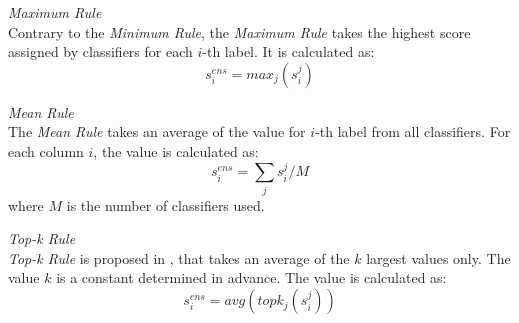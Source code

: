 \emph{Maximum Rule}\\
Contrary to the \emph{Minimum Rule}, the \emph{Maximum Rule} takes the highest score assigned by classifiers for each $i$-th label. It is calculated as:
\[s^{ens}_{i} = max_{j}(s^{j}_i)\]

\emph{Mean Rule}\\
The \emph{Mean Rule} takes an average of the value for $i$-th label from all classifiers. For each column $i$, the value is calculated as:
\[s^{ens}_{i} = \sum\limits_{j}{}s^{j}_i / M\]
where $M$ is the number of classifiers used.

\emph{Top-k Rule}\\
\emph{Top-k Rule} is proposed in \cite{sanden2011enhancing}, that takes an average of the $k$ largest values only. The value $k$ is a constant determined in advance. The value is calculated as:
\[s^{ens}_{i} = avg(topk_{j}(s^{j}_{i}))\]

